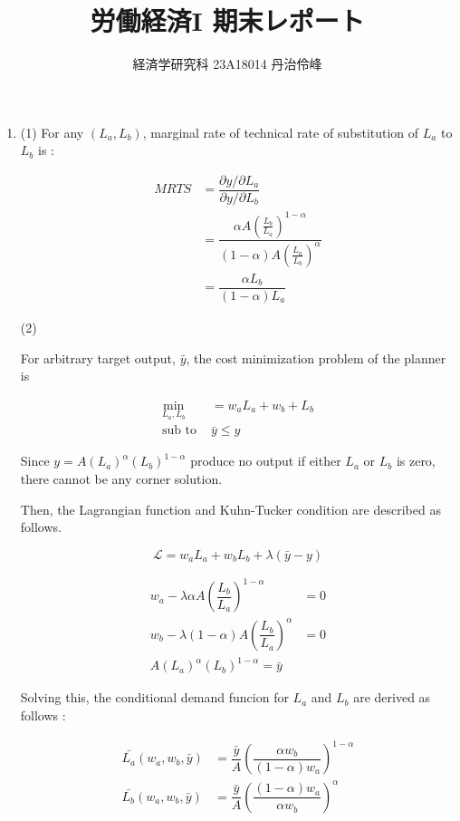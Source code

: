 \documentclass[dvipdfmx]{jsarticle}
\begin{document}
\title{労働経済I 期末レポート}
\author{経済学研究科 23A18014 丹治伶峰}
\date{}
\maketitle

\large

 \begin{enumerate}
 
 \item
 
 (1)
  For any $(L_a, L_b)$, marginal rate of technical rate of substitution of $L_a$ to $L_b$ is :
 
  \begin{align*}
  \textit{MRTS} &= \dfrac{\partial y / \partial L_a}{\partial y / \partial L_b} \\
  &= \dfrac{\alpha A (\frac{L_b}{L_a})^{1-\alpha}}{(1-\alpha) A (\frac{L_a}{L_b})^\alpha} \\
  &= \dfrac{\alpha L_b}{(1-\alpha) L_a}
  \end{align*}
 
 (2)
 
 For arbitrary target output, $\bar{y}$, the cost minimization problem of the planner is
 
  \begin{align*}
  \min_{L_a, L_b} &= w_a L_a + w_b + L_b \\
  \text{sub to } & \bar{y} \leq y
  \end{align*}
 
 Since $y = A(L_a)^{\alpha} (L_b)^{1-\alpha}$ produce no output if either $L_a$ or $L_b$ is zero, there cannot be any corner solution.
 
 Then, the Lagrangian function and Kuhn-Tucker condition are described as follows.
 
 \[ \mathcal{L} = w_a L_a+ w_b L_b + \lambda(\bar{y} - y) \]
 
  \begin{align*}
  w_a - \lambda \alpha A \left( \dfrac{L_b}{L_a} \right)^{1-\alpha} &=0 \\
  w_b - \lambda (1-\alpha) A \left( \dfrac{L_b}{L_a} \right)^{\alpha} &=0 \\
  A (L_a)^{\alpha} (L_b)^{1- \alpha} = \bar{y}
  \end{align*}
 
 Solving this, the conditional demand funcion for $L_a$ and $L_b$ are derived as follows :
 
  \begin{align*}
  \bar{L_a}(w_a, w_b, \bar{y}) &
  = \dfrac{\bar{y}}{A} \left( \dfrac{\alpha w_b}{(1-\alpha) w_a} \right)^{1-\alpha} \\
  \bar{L_b}(w_a, w_b, \bar{y}) &
  = \dfrac{\bar{y}}{A} \left( \dfrac{(1-\alpha) w_a}{\alpha w_b} \right)^{\alpha}
  \end{align*}
 

\end{enumerate}
\end{document}
